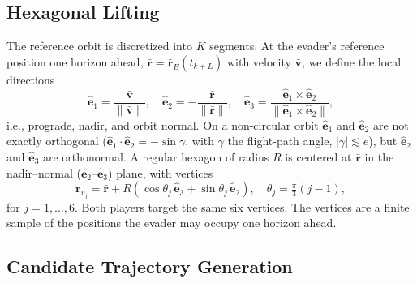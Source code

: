 
\subsection{Hexagonal Lifting}

The reference orbit is discretized into $K$ segments. At the evader's reference position one horizon ahead, $\bar{\mathbf{r}} = \bar{\mathbf{r}}_E(t_{k+L})$ with velocity $\bar{\mathbf{v}}$, we define the local directions
%
\begin{equation}
\hat{\mathbf{e}}_1 = \frac{\bar{\mathbf{v}}}{\|\bar{\mathbf{v}}\|}, \quad
\hat{\mathbf{e}}_2 = -\frac{\bar{\mathbf{r}}}{\|\bar{\mathbf{r}}\|}, \quad
\hat{\mathbf{e}}_3 = \frac{\hat{\mathbf{e}}_1 \times \hat{\mathbf{e}}_2}{\|\hat{\mathbf{e}}_1 \times \hat{\mathbf{e}}_2\|},
\label{eq:frame}
\end{equation}
%
i.e., prograde, nadir, and orbit normal. On a non-circular orbit $\hat{\mathbf{e}}_1$ and $\hat{\mathbf{e}}_2$ are not exactly orthogonal ($\hat{\mathbf{e}}_1 \cdot \hat{\mathbf{e}}_2 = -\sin\gamma$, with $\gamma$ the flight-path angle, $|\gamma| \lesssim e$), but $\hat{\mathbf{e}}_2$ and $\hat{\mathbf{e}}_3$ are orthonormal. A regular hexagon of radius $R$ is centered at $\bar{\mathbf{r}}$ in the nadir--normal ($\hat{\mathbf{e}}_2$--$\hat{\mathbf{e}}_3$) plane, with vertices
%
\begin{equation}
\mathbf{r}_{v_j} = \bar{\mathbf{r}} + R\left(\cos\theta_j\, \hat{\mathbf{e}}_3 + \sin\theta_j\, \hat{\mathbf{e}}_2\right), \quad \theta_j = \tfrac{\pi}{3}(j-1),
\label{eq:vertices}
\end{equation}
%
for $j = 1, \dots, 6$. Both players target the same six vertices. The vertices are a finite sample of the positions the evader may occupy one horizon ahead. 


\subsection{Candidate Trajectory Generation}


